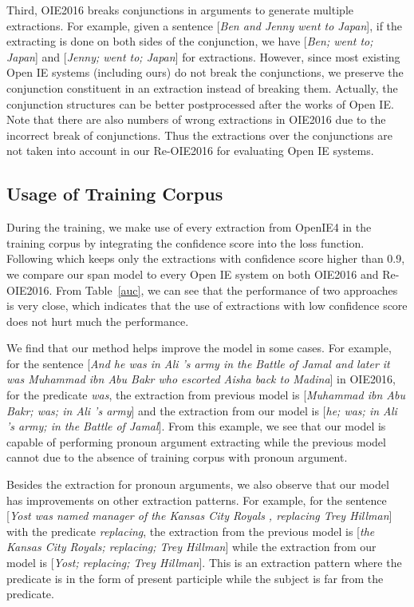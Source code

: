 \documentclass[letterpaper]{article} \usepackage{aaai20}  \usepackage{times}  \usepackage{helvet} \usepackage{courier}  \usepackage[hyphens]{url}  \urlstyle{rm} \def\UrlFont{\rm}  \usepackage{graphicx}  \frenchspacing  \setlength{\pdfpagewidth}{8.5in}  \setlength{\pdfpageheight}{11in}
\begin{document}
Third, OIE2016 breaks conjunctions in arguments to generate multiple extractions. For example, given a sentence [\emph{Ben and Jenny went to Japan}], if the extracting is done on both sides of the conjunction, we have [\emph{Ben; went to; Japan}] and [\emph{Jenny; went to; Japan}] for extractions. However, since most existing Open IE systems (including ours) do not break the conjunctions, we preserve the conjunction constituent in an extraction instead of breaking them. Actually, the conjunction structures can be better postprocessed after the works of Open IE. Note that there are also numbers of wrong extractions in OIE2016 due to the incorrect break of conjunctions. Thus the extractions over the conjunctions are not taken into account in our Re-OIE2016 for evaluating Open IE systems.     



\subsection{Usage of Training Corpus}
During the training, we make use of every extraction from OpenIE4 in the training corpus by integrating the confidence score into the loss function. Following \cite{Cui2018NeuralOI} which keeps only the extractions with confidence score higher than 0.9, we compare our span model to every Open IE system on both OIE2016 and Re-OIE2016. From Table~\ref{auc}, we can see that the performance of two approaches is very close, which indicates that the use of extractions with low confidence score does not hurt much the performance. 

We find that our method helps improve the model in some cases. For example, for the sentence [\emph{And he was in Ali 's army in the Battle of Jamal and later it was Muhammad ibn Abu Bakr who escorted Aisha back to Madina}] in OIE2016, for the predicate \emph{was}, the extraction from previous model is [\emph{Muhammad ibn Abu Bakr; was; in Ali 's army}] and the extraction from  our model is [\emph{he; was; in Ali 's army; in the Battle of Jamal}]. From this example, we see that our model is capable of performing pronoun argument extracting while the previous model cannot due to the absence of training corpus with pronoun argument.

Besides the extraction for pronoun arguments, we also observe that our model has improvements on other extraction patterns. For example, for the sentence [\emph{Yost was named manager of the Kansas City Royals , replacing Trey Hillman}] with the predicate \emph{replacing}, the extraction from the previous model is [\emph{the Kansas City Royals; replacing; Trey Hillman}] while the extraction from our model is [\emph{Yost; replacing; Trey Hillman}]. This is an extraction pattern where the predicate is in the form of present participle while the subject is far from the predicate. 
\end{document}
